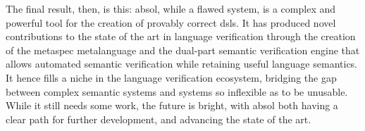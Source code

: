 The final result, then, is this: \gls{absol}, while a flawed system, is a complex and powerful tool for the creation of provably correct \glspl{dsl}. 
It has produced novel contributions to the state of the art in language verification through the creation of the \gls{metaspec} metalanguage and the dual-part semantic verification engine that allows automated semantic verification while retaining useful language semantics.
It hence fills a niche in the language verification ecosystem, bridging the gap between complex semantic systems and systems so inflexible as to be unusable.
While it still needs some work, the future is bright, with \gls{absol} both having a clear path for further development, and advancing the state of the art. 

